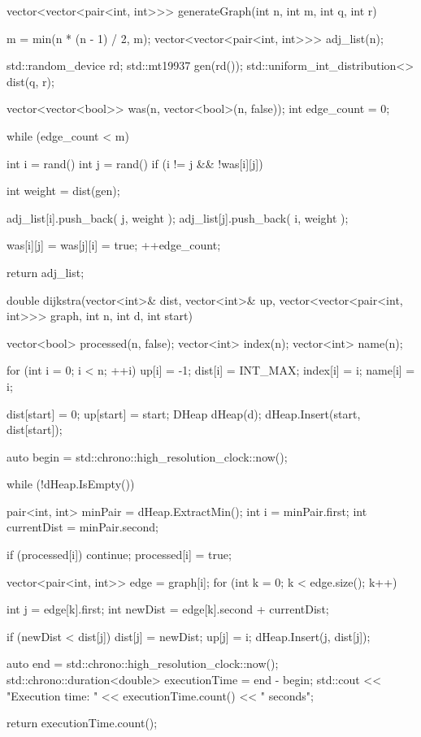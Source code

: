 vector<vector<pair<int, int>>> generateGraph(int n, int m, int q, int r) {
    m = min(n * (n - 1) / 2, m);
    vector<vector<pair<int, int>>> adj_list(n);

    std::random_device rd;
    std::mt19937 gen(rd());
    std::uniform_int_distribution<> dist(q, r);

    vector<vector<bool>> was(n, vector<bool>(n, false));
    int edge_count = 0;

    while (edge_count < m) {
        int i = rand() %
        int j = rand() %
        if (i != j && !was[i][j]) {
            int weight = dist(gen);

            adj_list[i].push_back({ j, weight });
            adj_list[j].push_back({ i, weight });

            was[i][j] = was[j][i] = true;
            ++edge_count;
        }
    }
    return adj_list;
}

double dijkstra(vector<int>& dist, vector<int>& up, vector<vector<pair<int, int>>> graph, int n, int d, int start) {
    vector<bool> processed(n, false);
    vector<int> index(n);
    vector<int> name(n);

    for (int i = 0; i < n; ++i) {
        up[i] = -1;
        dist[i] = INT_MAX;
        index[i] = i;
        name[i] = i;
    }

    dist[start] = 0;
    up[start] = start;
    DHeap dHeap(d);
    dHeap.Insert(start, dist[start]);

    auto begin = std::chrono::high_resolution_clock::now();

    while (!dHeap.IsEmpty()) {
        pair<int, int> minPair = dHeap.ExtractMin();
        int i = minPair.first;
        int currentDist = minPair.second;

        if (processed[i]) continue;
        processed[i] = true;

        vector<pair<int, int>> edge = graph[i];
        for (int k = 0; k < edge.size(); k++) {
            int j = edge[k].first;
            int newDist = edge[k].second + currentDist;

            if (newDist < dist[j]) {
                dist[j] = newDist;
                up[j] = i;
                dHeap.Insert(j, dist[j]);
            }
        }
    }

    auto end = std::chrono::high_resolution_clock::now();
    std::chrono::duration<double> executionTime = end - begin;
    std::cout << "Execution time: " << executionTime.count() << " seconds\n";

    return executionTime.count();
}